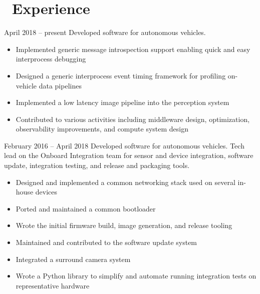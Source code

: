 \documentclass{resume}
\begin{document}

 
\section{\faWrench\ Experience}
          {April 2018 -- present}
Developed software for autonomous vehicles.
\begin{itemize}
  \item Implemented generic message introspection support enabling quick and easy interprocess debugging
  \item Designed a generic interprocess event timing framework for profiling on-vehicle data pipelines
  \item Implemented a low latency image pipeline into the perception system
  \item Contributed to various activities including middleware design, optimization,
      observability improvements, and compute system design
\end{itemize}
\vspace{3mm}

          {February 2016 -- April 2018}
Developed software for autonomous vehicles. Tech lead on the Onboard Integration team for sensor
and device integration, software update, integration testing, and release and packaging tools.
\begin{itemize}
  \item Designed and implemented a common networking stack used on several in-house devices
  \item Ported and maintained a common bootloader
  \item Wrote the initial firmware build, image generation, and release tooling
  \item Maintained and contributed to the software update system
  \item Integrated a surround camera system
  \item Wrote a Python library to simplify and automate running integration tests on representative hardware
\end{itemize}
\vspace{3mm}
\end{document}
